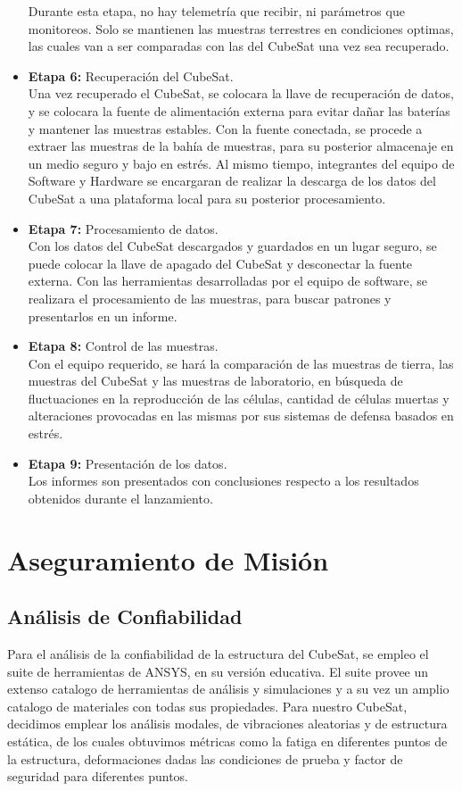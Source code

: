 \begin{itemize}
      Durante esta etapa, no hay telemetría que recibir, ni parámetros que monitoreos. Solo se mantienen las muestras
      terrestres en condiciones optimas, las cuales van a ser comparadas con las del CubeSat una vez sea recuperado.
    \item \textbf{Etapa 6:} Recuperación del CubeSat.\\
      Una vez recuperado el CubeSat, se colocara la llave de recuperación de datos, y se colocara la fuente de
      alimentación externa para evitar dañar las baterías y mantener las muestras estables. Con la fuente conectada, se
      procede a extraer las muestras de la bahía de muestras, para su posterior almacenaje en un medio seguro y bajo en
      estrés. Al mismo tiempo, integrantes del equipo de Software y Hardware se encargaran de realizar la descarga de
      los datos del CubeSat a una plataforma local para su posterior procesamiento.
    \item \textbf{Etapa 7:} Procesamiento de datos.\\
      Con los datos del CubeSat descargados y guardados en un lugar seguro, se puede colocar la llave de apagado del
      CubeSat y desconectar la fuente externa. Con las herramientas desarrolladas por el equipo de software, se
      realizara el procesamiento de las muestras, para buscar patrones y presentarlos en un informe.
    \item \textbf{Etapa 8:} Control de las muestras.\\
      Con el equipo requerido, se hará la comparación de las muestras de tierra, las muestras del CubeSat y las muestras
      de laboratorio, en búsqueda de fluctuaciones en la reproducción de las células, cantidad de células muertas y
      alteraciones provocadas en las mismas por sus sistemas de defensa basados en estrés.
    \item \textbf{Etapa 9:} Presentación de los datos.\\
      Los informes son presentados con conclusiones respecto a los resultados obtenidos durante el lanzamiento.
  \end{itemize}

\section{Aseguramiento de Misión}

  \subsection{Análisis de Confiabilidad}
    Para el análisis de la confiabilidad de la estructura del CubeSat, se empleo el suite de herramientas de ANSYS, en
    su versión educativa. El suite provee un extenso catalogo de herramientas de análisis y simulaciones y a su vez un
    amplio catalogo de materiales con todas sus propiedades. Para nuestro CubeSat, decidimos emplear los análisis
    modales, de vibraciones aleatorias y de estructura estática, de los cuales obtuvimos métricas como la fatiga en
    diferentes puntos de la estructura, deformaciones dadas las condiciones de prueba y factor de seguridad para
    diferentes puntos.

